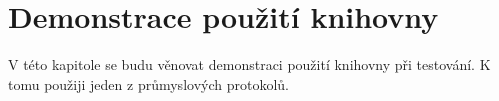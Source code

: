 \chapter{Demonstrace použití knihovny}\label{chap:demonstration}

V této kapitole se budu věnovat demonstraci použití knihovny při testování. K tomu použiji jeden z průmyslových protokolů.

